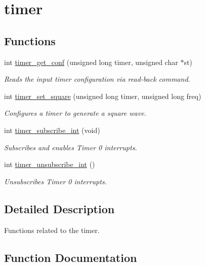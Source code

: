 \hypertarget{group__timer}{}\section{timer}
\label{group__timer}
\subsection*{Functions}
\begin{DoxyCompactItemize}
\item 
int \hyperlink{group__timer_ga8eb3357bc05265afc4bea5bbbb480a53}{timer\+\_\+get\+\_\+conf} (unsigned long timer, unsigned char $\ast$st)
\begin{DoxyCompactList}\small\item\em Reads the input timer configuration via read-\/back command. \end{DoxyCompactList}\item 
int \hyperlink{group__timer_gada4efbb5c88275795526fc45f0814aa3}{timer\+\_\+set\+\_\+square} (unsigned long timer, unsigned long freq)
\begin{DoxyCompactList}\small\item\em Configures a timer to generate a square wave. \end{DoxyCompactList}\item 
int \hyperlink{group__timer_ga4c5d9f47323eda494cfd826f6d62eec9}{timer\+\_\+subscribe\+\_\+int} (void)
\begin{DoxyCompactList}\small\item\em Subscribes and enables Timer 0 interrupts. \end{DoxyCompactList}\item 
int \hyperlink{group__timer_gab9eea51549744bca5c5c923b388bb4ee}{timer\+\_\+unsubscribe\+\_\+int} ()
\begin{DoxyCompactList}\small\item\em Unsubscribes Timer 0 interrupts. \end{DoxyCompactList}\end{DoxyCompactItemize}


\subsection{Detailed Description}
Functions related to the timer. 

\subsection{Function Documentation}
\hypertarget{group__timer_ga8eb3357bc05265afc4bea5bbbb480a53}{}
